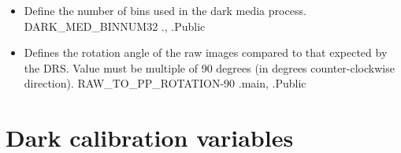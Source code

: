 \begin{itemize}
\item {} 
{Define the number of bins used in the dark media process.}
{DARK\_MED\_BINNUM}{32}
{\calpreprocess}{\constantsfile}{\spirouImage., \spirouImage.}{Public}

\item {} 
{Defines the rotation angle of the raw images compared to that expected by the DRS. Value must be multiple of 90 degrees (in degrees counter-clockwise direction).}
{RAW\_TO\_PP\_ROTATION}{-90}
{\AllRecipes}{\constantsfile}{\calpreprocess.main, \spirouImage.}{Public}

\end{itemize}



\clearpage
\newpage
\section{Dark calibration variables}
\label{ch:variables:dark}


